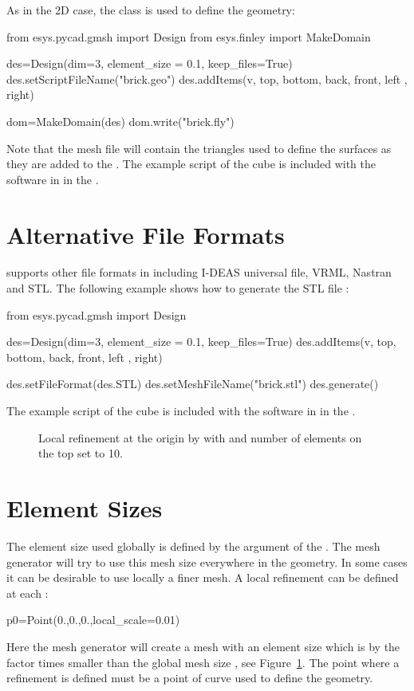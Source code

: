 As in the 2D case, the  class is used to define the geometry:
\begin{python}
from esys.pycad.gmsh import Design
from esys.finley import MakeDomain

des=Design(dim=3, element_size = 0.1, keep_files=True)
des.setScriptFileName("brick.geo")
des.addItems(v, top, bottom, back, front, left , right)

dom=MakeDomain(des)
dom.write("brick.fly")
\end{python}
Note that the \finley mesh file  will contain the
triangles used to define the surfaces as they are added to the .
The example script of the cube is included with the software in
 in the \ExampleDirectory.

\section{Alternative File Formats}
 supports other file formats in including
I-DEAS universal file, VRML, Nastran and STL. The following example shows how
to generate the STL file :
\begin{python}
from esys.pycad.gmsh import Design

des=Design(dim=3, element_size = 0.1, keep_files=True)
des.addItems(v, top, bottom, back, front, left , right)

des.setFileFormat(des.STL)
des.setMeshFileName("brick.stl")
des.generate()
\end{python}
The example script of the cube is included with the software in
 in the \ExampleDirectory.


\begin{figure}
\caption{Local refinement at the origin by
with  and number of elements on the top set to 10.}
\label{fig:PYCAD 5}
\end{figure}

\section{Element Sizes}
The element size used globally is defined by the
 argument of the . The mesh generator
will try to use this mesh size everywhere in the geometry. In some cases it can be
desirable to use locally a finer mesh. A local refinement can be defined at each
:
\begin{python}
p0=Point(0.,0.,0.,local_scale=0.01)
\end{python}
Here the mesh generator will create a mesh with an element size which is by the factor 
times smaller than the global mesh size , see Figure~\ref{fig:PYCAD 5}. The point where a refinement is defined must be a point of curve used to define the geometry.

